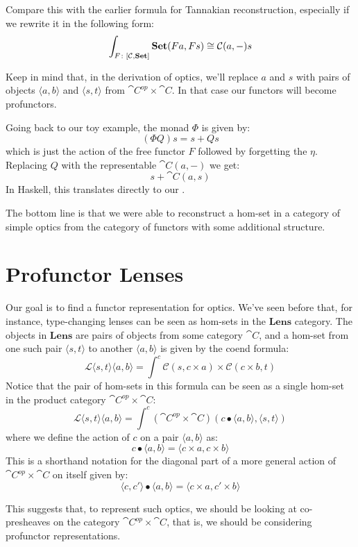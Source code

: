 \documentclass[DaoFP]{subfiles}
\begin{document}
Compare this with the earlier formula for Tannakian reconstruction, especially if we rewrite it in the following form:
\[ \int_{F \colon [\mathcal{C}, \mathbf{Set}]} \mathbf{Set} (F a, F s) \cong \mathcal{C}(a, -) s\]

Keep in mind that, in the derivation of optics, we'll replace $a$ and $s$ with pairs of objects $\langle a, b \rangle$ and $\langle s, t \rangle$  from $\cat C^{op} \times \cat C$. In that case our functors will become profunctors.

Going back to our toy example, the monad $\Phi$ is given by:
\[ (\Phi Q) s = s + Q s \]
which is just the action of the free functor $F$ followed by forgetting the $\eta$. Replacing $Q$ with the representable $\cat C (a, -)$ we get:
\[ s + \cat C (a, s) \]
In Haskell, this translates directly to our .

The bottom line is that we were able to reconstruct a hom-set in a category of simple optics from the category of functors with some additional structure. 

\section{Profunctor Lenses}

Our goal is to find a functor representation for optics. We've seen before that, for instance, type-changing lenses can be seen as hom-sets in the $\mathbf{Lens}$ category. The objects in $\mathbf{Lens}$ are pairs of objects from some category $\cat C$, and a hom-set from one such pair $\langle s, t \rangle$ to another  $\langle a, b \rangle$ is given by the coend formula:
\[ \mathcal{L}\langle s, t\rangle \langle a, b \rangle = \int^{c} \mathcal{C}(s, c \times a) \times  \mathcal{C}(c \times b, t) \]
Notice that the pair of hom-sets in this formula can be seen as a single hom-set in the product category $\cat C^{op} \times \cat C$:
\[  \mathcal{L}\langle s, t\rangle \langle a, b \rangle =  \int^{c} (\cat C^{op} \times \cat C )(c \bullet \langle a, b \rangle, \langle s, t \rangle)  \]
where we define the action of $c$ on a pair $\langle a, b \rangle$ as:
\[ c \bullet \langle a, b \rangle = \langle c \times a, c \times b \rangle \]
This is a shorthand notation for the diagonal part of a more general action of $\cat C^{op} \times \cat C$ on itself given by:
 \[ \langle c, c' \rangle \bullet \langle a, b \rangle = \langle c \times a, c' \times b \rangle \]


This suggests that, to represent such optics, we should be looking at co-presheaves on the category $\cat C^{op} \times \cat C$, that is, we should be considering profunctor representations. 
\end{document}
